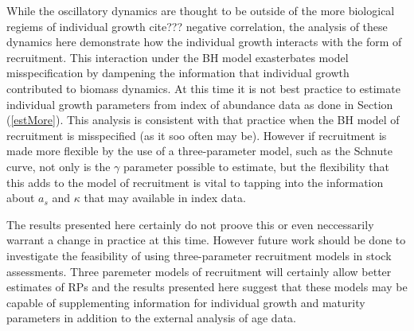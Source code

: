 %
While the oscillatory dynamics are thought to be outside of the more biological 
regiems of individual growth {\color{red} cite??? \cite{denney_lifehistory_2002} negative correlation},
the analysis of these dynamics here demonstrate how the individual growth 
interacts with the form of recruitment. This interaction under the BH model 
exasterbates model misspecification by dampening the information that individual growth contributed to biomass dynamics.
At this time it is not best practice to estimate individual growth parameters 
from index of abundance data as done in Section (\ref{estMore}). This analysis 
is consistent with that practice when the BH model of recruitment is misspecified (as it soo often may be). 
However if recruitment is made more flexible by the use of a three-parameter model, 
such as the Schnute curve, not only is the $\gamma$ parameter possible to estimate, but the
flexibility that this adds to the model of recruitment is vital to tapping into 
the information about $a_s$ and $\kappa$ that may available in index data.  

%
The results presented here certainly do not proove this or even neccessarily 
warrant a change in practice at this time. However future work should be done 
to investigate the feasibility of using three-parameter recruitment models in 
stock assessments. 
Three paremeter models of recruitment will certainly allow better estimates of RPs 
and the results presented here suggest that these models may be capable of supplementing
information for individual growth and maturity parameters in addition to the external 
analysis of age data. %





